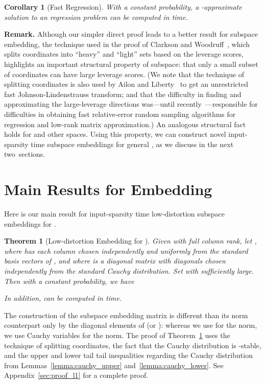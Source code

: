 \documentclass[11pt]{article}
\newtheorem{theorem}{Theorem}
\newtheorem{corollary}{Corollary}
\begin{document}
\begin{corollary}[Fast  Regression]
  With a constant probability, a -approximate solution to an
   regression problem can be computed in  time.
\end{corollary}


\noindent
\textbf{Remark.}  
Although our simpler direct proof leads to a better result for  subspace
embedding, the technique used in the proof of Clarkson and
Woodruff~\cite{CW12sparse_TR}, which splits coordinates into ``heavy'' and
``light'' sets based on the leverage scores, highlights an important structural
property of  subspace: that only a small subset of coordinates can have
large  leverage scores.  
(We note that the technique of splitting coordinates is also used by Ailon and
Liberty~\cite{AL11} to get an unrestricted fast Johnson-Lindenstrauss transform;
and that the difficulty in finding and approximating the large-leverage
directions was---until
recently~\cite{Mah-mat-rev_BOOK,DMMW12_ICML}---responsible for difficulties in
obtaining fast relative-error random sampling algorithms for  regression
and low-rank matrix approximation.)  
An analogous structural fact holds for  and other  spaces.  
Using this property, we can construct novel input-sparsity time  
subspace embeddings for general , as we discuss in the next 
two~sections.


\section{Main Results for  Embedding}
\label{sxn:l1} 

Here is our main result for input-sparsity time low-distortion subspace
embeddings for .

\begin{theorem}[Low-distortion Embedding for ]
  \label{thm:sparse_l1}
  Given  with full column rank, let , where  has each column chosen
  independently and uniformly from the  standard basis vectors of , and
  where  is a diagonal matrix with diagonals chosen
  independently from the standard Cauchy distribution.
  Set  with  sufficiently large.
  Then with a constant probability, we have
  
  In addition,  can be computed in  time.
\end{theorem}

\noindent
The construction of the  subspace embedding matrix is different than its
 norm counterpart only by the diagonal elements of  (or ): whereas
we use  for the  norm, we use Cauchy variables for the 
norm. 
The proof of Theorem~\ref{thm:sparse_l1} uses the technique of splitting
coordinates, the fact that the Cauchy distribution is -stable, and the upper
and lower tail tail inequalities regarding the Cauchy distribution from
Lemmas~\ref{lemma:cauchy_upper} and~\ref{lemma:cauchy_lower}.
See Appendix~\ref{sec:proof_l1} for a complete proof.
\end{document}
